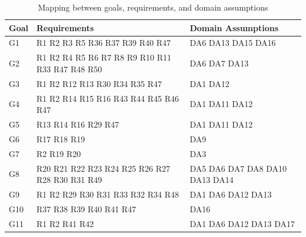 \begin{table}[H]
  \begin{tabular}{|l|p{9cm}|p{5cm}| }
    \hline
    \textbf{Goal} & \textbf{Requirements} & \textbf{Domain Assumptions}      \\
    \hline
    G1 & R1 R2 R3 R5 R36 R37 R39 R40 R47 & DA6 DA13 DA15 DA16 \\
    \hline
    G2 & R1 R2 R4 R5 R6 R7 R8 R9 R10 R11 R33 R47 R48 R50 & DA6 DA7 DA13 \\
    \hline
    G3 & R1 R2 R12 R13 R30 R34 R35 R47 & DA1 DA12 \\
    \hline
    G4 & R1 R2 R14 R15 R16 R43 R44 R45 R46 R47 & DA1 DA11 DA12 \\
    \hline
    G5 & R13 R14 R16 R29 R47 & DA1 DA11 DA12 \\
    \hline
    G6 & R17 R18 R19 & DA9 \\
    \hline
    G7 & R2 R19 R20 & DA3  \\
    \hline
    G8 & R20 R21 R22 R23 R24 R25 R26 R27 R28 R30 R31 R49 & DA5 DA6 DA7 DA8 DA10 DA13 DA14 \\
    \hline
    G9 & R1 R2 R29 R30 R31 R33 R32 R34 R48 & DA1 DA6 DA12 DA13 \\
    \hline
    G10 & R37 R38 R39 R40 R41 R47 & DA16 \\
    \hline
    G11 & R1 R2 R41 R42 & DA1 DA6 DA12 DA13 DA17 \\
    \hline
  \end{tabular}
  \caption{Mapping between goals, requirements, and domain assumptions}
  \label{tab:mapping}
\end{table}

